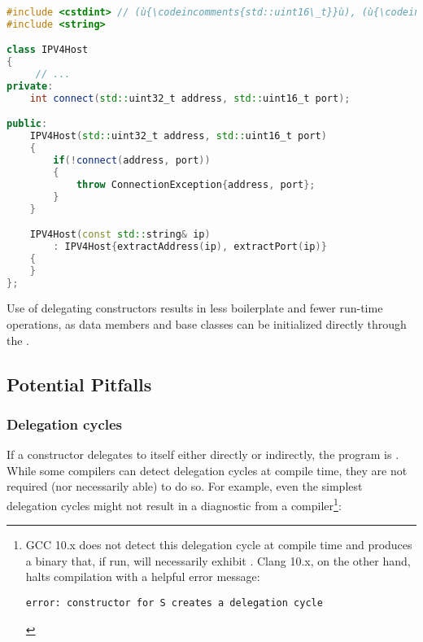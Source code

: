\begin{lstlisting}[language=C++]
#include <cstdint> // (ù{\codeincomments{std::uint16\_t}}ù), (ù{\codeincomments{std::uint32\_t}}ù)
#include <string>

class IPV4Host
{
     // ...
private:
    int connect(std::uint32_t address, std::uint16_t port);

public:
    IPV4Host(std::uint32_t address, std::uint16_t port)
    {
        if(!connect(address, port))
        {
            throw ConnectionException{address, port};
        }
    }

    IPV4Host(const std::string& ip)
        : IPV4Host{extractAddress(ip), extractPort(ip)}
    {
    }
};
\end{lstlisting}

\noindent Use of
delegating constructors results in less boilerplate and fewer run-time
operations, as data members and base classes can be initialized
directly through the .

\subsection[Potential Pitfalls]{Potential Pitfalls}\label{ctordelegrating-potential-pitfalls}

\subsubsection[Delegation cycles]{Delegation cycles}\label{delegation-cycles}

If a constructor delegates to itself either directly or indirectly, the
program is . While some
compilers can detect delegation cycles at compile time, they are not
required (nor necessarily able) to do so. For example, even the simplest delegation cycles might not result in a diagnostic from a compiler{\cprotect\footnote{GCC 10.x does not detect this delegation
cycle at compile time and produces a binary that, if run, will
necessarily exhibit . Clang 10.x, on the
other hand, halts compilation with a helpful error message:

\begin{lstlisting}[style=plain, basicstyle={\ttfamily\footnotesize}]
error: constructor for S creates a delegation cycle
\end{lstlisting}\vspace*{-1ex}
      }}:

